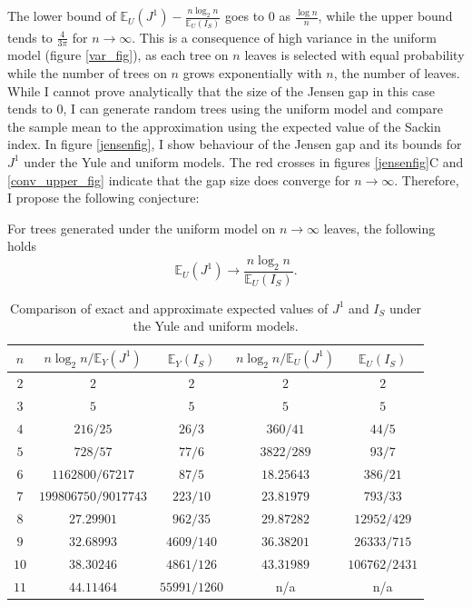 The lower bound of $\mathbb{E}_U(J^1)-\frac{n\log_2n}{\mathbb{E}_U(I_S)}$ goes
to $0$ as $\frac{\log n}{n}$, while the upper bound tends to $\frac{4}{3\pi}$
for $n\to\infty$. This is a consequence of high variance in the uniform model
(figure \ref{var_fig}), as each tree on $n$ leaves is selected with equal
probability while the number of trees on $n$ grows exponentially with $n$,
the number of leaves. While I cannot prove analytically that the size of the
Jensen gap in this case tends to $0$, I can generate random trees using the
uniform model and compare the sample mean to the approximation using the
expected value of the Sackin index. In figure \ref{jensenfig}, I show behaviour
of the Jensen gap and its bounds for $J^1$ under the Yule and uniform models.
The red crosses in figures \ref{jensenfig}C and \ref{conv_upper_fig} indicate
that the gap size does converge for $n\to\infty$. Therefore, I propose the
following conjecture:

\begin{conjecture}
    For trees generated under the uniform model on $n\to\infty$ leaves, the
    following holds
    \begin{equation}
        \mathbb{E}_U(J^1) \to \frac{n\log_2n}{\mathbb{E}_U(I_S)}.
        \label{conjecture1}
    \end{equation}
\end{conjecture}

\begin{table}[h]
    \centering
    \begin{tabular}{|c|c|c|c|c|}
        \hline
        $n$ & $n\log_2n/\mathbb{E}_Y(J^1)$ & $\mathbb{E}_Y(I_S)$ & $n\log_2n/
        \mathbb{E}_U(J^1)$ & $\mathbb{E}_U(I_S)$\\
        \hline
        $2$ & $2$ & $2$  & $2$ & $2$ \\
        \hline
        $3$ & $5$ & $5$  & $5$ & $5$ \\
        \hline
        $4$ & $216/25$ & $26/3$ & $360/41$ & $44/5$ \\
        \hline
        $5$ & $728/57$ & $77/6$ & $3822/289$ & $93/7$ \\
        \hline
        $6$ & $1162800/67217$ & $87/5$ & $18.25643$ & $386/21$ \\
        \hline
        $7$ & $199806750/9017743$ & $223/10$ & $23.81979$ & $793/33$ \\
        \hline
        $8$ & $27.29901$ & $962/35$& $29.87282$ & $12952/429$\\
        \hline
        $9$ & $32.68993$ & $4609/140$ & $36.38201$ & $26333/715$ \\
        \hline
        $10$ & $38.30246$ & $4861/126$ & $43.31989$ & $106762/2431$ \\
        \hline
        $11$ & $44.11464$ & $55991/1260$ & n/a & n/a \\
        \hline
    \end{tabular}
    \caption{Comparison of exact and approximate expected values of $J^1$ and
    $I_S$ under the Yule and uniform models.}
    \label{table_values}
\end{table}

